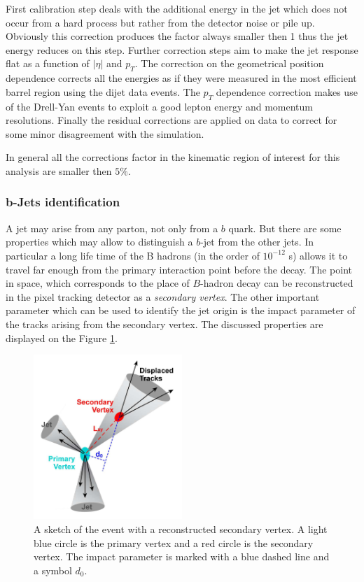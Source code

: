 First calibration step deals with the additional energy in the jet which does not occur from a hard process but rather from the detector noise or pile up. 
Obviously this correction produces the factor always smaller then 1 thus the jet energy reduces on this step. Further correction steps aim to make the jet response
flat as a function of $|\eta|$ and $p_{T}$. The correction on the geometrical position dependence corrects all the energies as if they were measured 
in the most efficient barrel region using the dijet data events. The $p_{T}$ dependence correction makes use of the Drell-Yan events to exploit a good
lepton energy and momentum resolutions. Finally the residual corrections are applied on data to correct for some minor disagreement with the simulation.

In general all the corrections factor in the kinematic region of interest for this analysis are smaller then $5\%$.

\subsubsection{b-Jets identification}\label{ssec:bTag}

A jet may arise from any parton, not only from a $b$ quark. But there are some properties which may allow to distinguish a $b$-jet from the other jets. In particular
a long life time of the B hadrons (in the order of $10^{-12}$ s) allows it to travel far enough from the primary interaction point before the decay. The point
in space, which corresponds to the place of $B$-hadron decay can be reconstructed in the pixel tracking detector as a \textit{secondary vertex}. The other important
parameter which can be used to identify the jet origin is the impact parameter of the tracks arising from the secondary vertex. The discussed properties are 
displayed on the Figure \ref{fig:SV}.

\begin{figure}[t]
  \centering
  \includegraphics[width=0.5\textwidth]{04_event_reconstruction/plots/btagging_cartoon.png}
  \caption{A sketch of the event with a reconstructed secondary vertex. A light blue circle is the primary vertex and a red circle is the secondary vertex. The impact 
  parameter is marked with a blue dashed line and a symbol $d_{0}$.}
  \label{fig:SV}
\end{figure}

